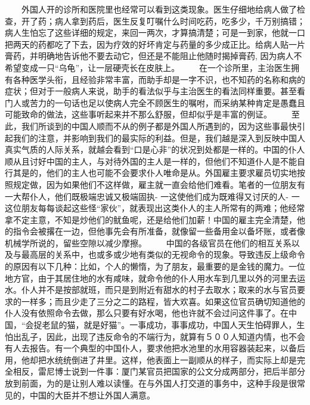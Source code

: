 \documentclass[12pt,oneside]{book}
\begin{document}
\begin{common-format}
　　外国人开的诊所和医院里也经常可以看到这类现象。医生仔细地给病人做了检查，开了药；病人拿到药后，医生反复叮嘱什么时间吃药，吃多少，千万别搞错；病人生怕忘了这些详细的规定，来回一两次，才算搞清楚；可是一到家，他就一口把两天的药都吃了下去，因为疗效的好坏肯定与药量的多少成正比。给病人贴一片膏药，并明确地告诉他不要去动它，但还是不能阻止他随时揭掉膏药, 因为病人不希望变成一只“乌龟”，让一层硬壳长在皮肤上。 
　　在一个诊所里，主治医生拥有各种医学头衔，且经验非常丰富，而助手却是一字不识，也不知药的名称和病的症状；但对于一般病人来说，助手的看法似乎与主治医生的看法同样重要。甚至看门人或苦力的一句话也足以使病人完全不顾医生的嘱咐，而采纳某种肯定是愚蠢且可能致命的做法，这些事听起来并不那么舒服，但却似乎是丰富的例证。 
　　至此，我们所谈到的中国人顺而不从的例子都是外国人所遇到的，因为这些事最快引起我们的注意，并影响到我们的最实际的利益。但是，我们越是深入到反映中国人真实气质的人际关系，就越会看到“口是心非”的状况到处都是一样的。中国的仆人顺从且讨好中国的主人，与对待外国的主人是一样的，但他们不知道仆人是不能自行其是的，他们的主人也可能不会要求仆人唯命是从。外国雇主要求雇员切实地按照规定做，因为如果他们不这样做，雇主就一直会给他们难看。笔者的一位朋友有一大帮仆人，他们既极端忠诚又极端固执- 一这使他们成为既难得又讨厌的人- 一这位朋友每每谈起这些怪“家伙”，就表现出这类仆人的主人所常有的两难；他经常拿不定主意，不知是炒他们的鱿鱼呢，还是给他们加薪！中国的雇主完全清楚，他的指令会被撂在一边，但他事先会有所准备，就像留一些备用金以备坏账，或者像机械学所说的，留些空隙以减少摩擦。 
　　中国的各级官员在他们的相互关系以及与最高层的关系中，也或多或少地有类似的无视命令的现象。导致违反上级命令的原因有以下几种：比如，个人的懒惰，为了朋友，最重要的是金钱的魔力。一位地方官，由于其居住地的水有咸味，就命令他的仆人用水车到几里以外的河里去运水。仆人并不是按部就班，而只是到附近有甜水的村子去取水；取来的水与官员要求的一样多；而且少走了三分之二的路程，皆大欢喜。如果这位官员确切知道他的仆人没有依照命令去做，那么只要有好水喝，他也许就不会过问这件事了。在中国，“会捉老鼠的猫，就是好猫”。一事成功，事事成功，中国人天生怕碍罪人，生怕出乱子，因此，出现了违反命令的不端行为，就算有５００人知道内情，也不会有人去报告。有一个典型的中国仆人，要求他把水池里的水用容器装起来，以备后用，他却把水统统倒进了井里。这样，他表面上一副顺从的样子，而实际上却是完全相反，雷尼博士说到一件事：厦门某官员把国家的公文分成两部分，把后半部分放到前面，为的是让别人难以读懂。在与外国人打交道的事务中，这种手段是很常见的，中国的大臣并不想让外国人满意。 

\end{common-format}
\end{document}
